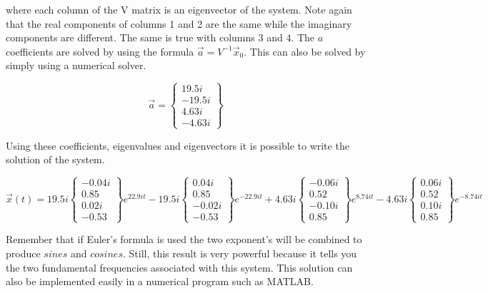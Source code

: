 \begin{enumerate}
   where each column of the V matrix is an eigenvector of the
   system. Note again that the real components of columns 1 and 2 are
   the same while the imaginary components are different. The same is
   true with columns 3 and 4. The $a$ coefficients are solved by using the formula $\vec{a} =
   V^{-1}\vec{x}_0$. This can also be solved by simply using a
   numerical solver.

   \begin{equation}
     \vec{a} = \begin{Bmatrix} 19.5i \\ -19.5i \\ 4.63i
       \\ -4.63i \end{Bmatrix}
   \end{equation}

   Using these coefficients, eigenvalues and eigenvectors
   it is possible to write the solution of the system. 

   \begin{equation}
     \vec{x}(t) = 19.5i\begin{Bmatrix} -0.04i \\ 0.85 \\ 0.02i \\
     -0.53 \end{Bmatrix} e^{22.9i t} -
     19.5i\begin{Bmatrix} 0.04i \\ 0.85 \\ -0.02i \\
     -0.53 \end{Bmatrix}e^{-22.9i t} + 
     4.63i\begin{Bmatrix} -0.06i \\ 0.52 \\ -0.10i \\
     0.85 \end{Bmatrix} e^{8.74i t} -
     4.63i\begin{Bmatrix} 0.06i \\ 0.52 \\ 0.10i \\
     0.85 \end{Bmatrix}e^{-8.74i t}
   \end{equation}
   
   Remember that if Euler's formula is used the two exponent's will be
   combined to produce $sines$ and $cosines$. Still, this result is
   very powerful because it tells you the two fundamental frequencies
   associated with this system. This solution can also be implemented easily
   in a numerical program such as MATLAB.


\end{enumerate}
